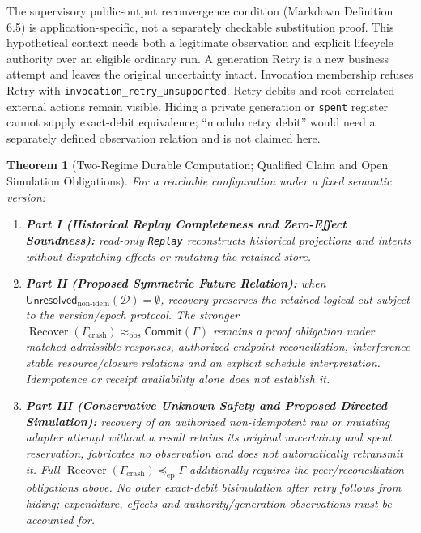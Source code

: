 \documentclass[11pt,a4paper]{article}
\newtheorem{theorem}{Theorem}[section]
\theoremstyle{definition}
\theoremstyle{remark}
\begin{document}
The supervisory public-output reconvergence condition (Markdown Definition 6.5) is application-specific, not a separately checkable substitution proof. This hypothetical context needs both a legitimate observation and explicit lifecycle authority over an eligible ordinary run. A generation Retry is a new business attempt and leaves the original uncertainty intact. Invocation membership refuses Retry with \texttt{invocation\_retry\_unsupported}. Retry debits and root-correlated external actions remain visible. Hiding a private generation or \texttt{spent} register cannot supply exact-debit equivalence; ``modulo retry debit'' would need a separately defined observation relation and is not claimed here.

\begin{theorem}[Two-Regime Durable Computation; Qualified Claim and Open Simulation Obligations]
\label{thm:fundamental}
For a reachable configuration under a fixed semantic version:
\begin{enumerate}
\item \textbf{Part I (Historical Replay Completeness and Zero-Effect Soundness):} read-only \texttt{Replay} reconstructs historical projections and intents without dispatching effects or mutating the retained store.
\item \textbf{Part II (Proposed Symmetric Future Relation):} when $\mathsf{Unresolved}_{\text{non-idem}}(\mathcal{D})=\emptyset$, recovery preserves the retained logical cut subject to the version/epoch protocol. The stronger $\operatorname{Recover}(\Gamma_{\text{crash}})\approx_{\mathrm{obs}}\mathsf{Commit}(\Gamma)$ remains a proof obligation under matched admissible responses, authorized endpoint reconciliation, interference-stable resource/closure relations and an explicit schedule interpretation. Idempotence or receipt availability alone does not establish it.
\item \textbf{Part III (Conservative Unknown Safety and Proposed Directed Simulation):} recovery of an authorized non-idempotent raw or mutating adapter attempt without a result retains its original uncertainty and spent reservation, fabricates no observation and does not automatically retransmit it. Full $\operatorname{Recover}(\Gamma_{\text{crash}})\preccurlyeq_{\mathrm{ep}}\Gamma$ additionally requires the peer/reconciliation obligations above. No outer exact-debit bisimulation after retry follows from hiding; expenditure, effects and authority/generation observations must be accounted for.
\end{enumerate}
\end{theorem}
\end{document}
